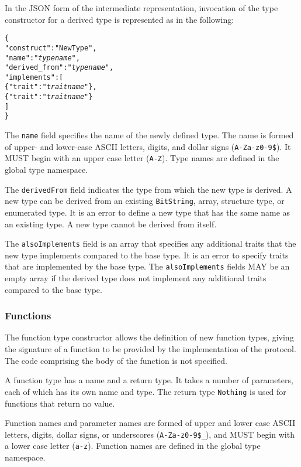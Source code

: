 \documentclass[10pt,twocolumn,a4paper]{article}
\newcommand{\code}[1]{\texttt{#1}}
\begin{document}
In the JSON form of the intermediate representation, invocation of the
type constructor for a derived type is represented as in the following:
\footnotesize
\begin{alltt}
  \{
    "construct"     : "NewType",
    "name"          : "\emph{type name}",
    "derived\_from"  : "\emph{type name}",
    "implements"    : [
      \{"trait" : "\emph{trait name}"\},
      \{"trait" : "\emph{trait name}"\}
    ]
  \}
\end{alltt}
\normalsize
The \code{name} field specifies the name of the newly defined type. The
name is formed of upper- and lower-case ASCII letters, digits, and dollar
signs (\code{A-Za-z0-9\$}).  It MUST begin with an upper case letter
(\code{A-Z}). Type names are defined in the global type namespace.

The \code{derivedFrom} field indicates the type from which the new type is
derived.  A new type can be derived from an existing \code{BitString},
array, structure type, or enumerated type. It is an error to define a new
type that has the same name as an existing type. A new type cannot be
derived from itself.

The \code{alsoImplements} field is an array that specifies any additional
traits that the new type implements compared to the base type. It is an
error to specify traits that are implemented by the base type.
The \code{alsoImplements} fields MAY be an empty array if the derived type
does not implement any additional traits compared to the base type.

\subsubsection{Functions}
\label{sec:functions}

The function type constructor allows the definition of new function types,
giving the signature of a function to be provided by the implementation of
the protocol. The code comprising the body of the function is not specified. 

A function type has a name and a return type. It takes a number of
parameters, each of which has its own name and type. The return type
\code{Nothing} is used for functions that return no value.

Function names and parameter names are formed of upper and lower case ASCII
letters, digits, dollar signs, or underscores (\code{A-Za-z0-9\$\_}), and
MUST begin with a lower case letter (\code{a-z}).
Function names are defined in the global type namespace.
\end{document}
